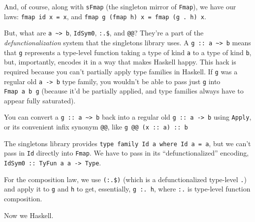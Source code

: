\documentclass[]{article}
\begin{document}
And, of course, along with \texttt{sFmap} (the singleton mirror of
\texttt{Fmap}), we have our laws: \texttt{fmap\ id\ x\ =\ x}, and
\texttt{fmap\ g\ (fmap\ h)\ x\ =\ fmap\ (g\ .\ h)\ x}.

But, what are \texttt{a\ \textasciitilde{}\textgreater{}\ b}, \texttt{IdSym0},
\texttt{:.\$}, and \texttt{@@}? They're a part of the \emph{defunctionalization}
system that the singletons library uses. A
\texttt{g\ ::\ a\ \textasciitilde{}\textgreater{}\ b} means that \texttt{g}
represents a type-level function taking a type of kind \texttt{a} to a type of
kind \texttt{b}, but, importantly, encodes it in a way that makes Haskell happy.
This hack is required because you can't partially apply type families in
Haskell. If \texttt{g} was a regular old \texttt{a\ -\textgreater{}\ b} type
family, you wouldn't be able to pass just \texttt{g} into \texttt{Fmap\ a\ b\ g}
(because it'd be partially applied, and type families always have to appear
fully saturated).

You can convert a \texttt{g\ ::\ a\ \textasciitilde{}\textgreater{}\ b} back
into a regular old \texttt{g\ ::\ a\ -\textgreater{}\ b} using \texttt{Apply},
or its convenient infix synonym \texttt{@@}, like
\texttt{g\ @@\ (x\ ::\ a)\ ::\ b}

The singletons library provides
\texttt{type\ family\ Id\ a\ where\ Id\ a\ =\ a}, but we can't pass in
\texttt{Id} directly into \texttt{Fmap}. We have to pass in its
``defunctionalized'' encoding,
\texttt{IdSym0\ ::\ TyFun\ a\ a\ -\textgreater{}\ Type}.

For the composition law, we use \texttt{(:.\$)} (which is a defunctionalized
type-level \texttt{.}) and apply it to \texttt{g} and \texttt{h} to get,
essentially, \texttt{g\ :.\ h}, where \texttt{:.} is type-level function
composition.

Now we Haskell.
\end{document}

